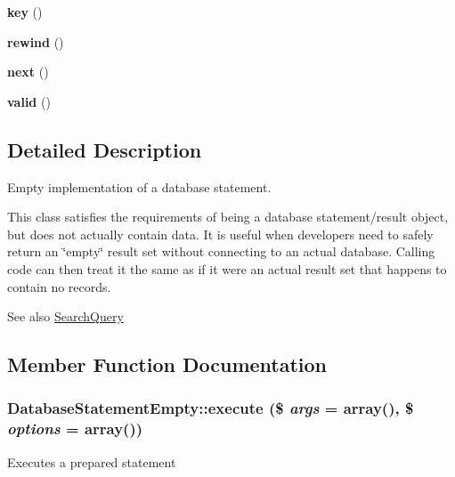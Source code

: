 \begin{DoxyCompactItemize}
\item 
\hypertarget{classDatabaseStatementEmpty_abc0587456f84f4e8d3d60a38c64d5080}{
{\bfseries key} ()}
\label{classDatabaseStatementEmpty_abc0587456f84f4e8d3d60a38c64d5080}

\item 
\hypertarget{classDatabaseStatementEmpty_af828c2432be191122fb55939a7f2c184}{
{\bfseries rewind} ()}
\label{classDatabaseStatementEmpty_af828c2432be191122fb55939a7f2c184}

\item 
\hypertarget{classDatabaseStatementEmpty_ad3dddbe954de423fb8c6edf74d3d018d}{
{\bfseries next} ()}
\label{classDatabaseStatementEmpty_ad3dddbe954de423fb8c6edf74d3d018d}

\item 
\hypertarget{classDatabaseStatementEmpty_a20e35d5049a44dbef376c40d9116630c}{
{\bfseries valid} ()}
\label{classDatabaseStatementEmpty_a20e35d5049a44dbef376c40d9116630c}

\end{DoxyCompactItemize}


\subsection{Detailed Description}
Empty implementation of a database statement.

This class satisfies the requirements of being a database statement/result object, but does not actually contain data. It is useful when developers need to safely return an \char`\"{}empty\char`\"{} result set without connecting to an actual database. Calling code can then treat it the same as if it were an actual result set that happens to contain no records.

\begin{DoxySeeAlso}{See also}
\hyperlink{classSearchQuery}{SearchQuery} 
\end{DoxySeeAlso}


\subsection{Member Function Documentation}
\hypertarget{classDatabaseStatementEmpty_a01d549f8173db0919ba199cb4e8d92a9}{
\subsubsection[{execute}]{\setlength{\rightskip}{0pt plus 5cm}DatabaseStatementEmpty::execute (\$ {\em args} = {\ttfamily array()}, \/  \$ {\em options} = {\ttfamily array()})}}
\label{classDatabaseStatementEmpty_a01d549f8173db0919ba199cb4e8d92a9}
Executes a prepared statement


